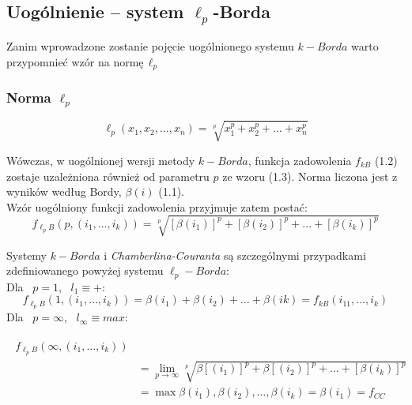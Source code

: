 \documentclass[pdflatex,11pt]{../aghdoc_version2}
\begin{document}
\subsection{Uogólnienie – system $\ell_p$-Borda}
\label{subsec:system_ell_p_borda}

Zanim wprowadzone zostanie pojęcie uogólnionego systemu $k-Borda$ warto przypomnieć wzór na normę\,$\ell_p$
\subsubsection{Norma $\ell_p$}
\label{subsubsection:norma_ell_p}
\begin{equation}
\ell_p(x_1,x_2,\dots, x_n) = \sqrt[p]{x_1^p+x_2^p+\dots+x_n^p}
\end{equation}


Wówczas, w uogólnionej wersji metody $k-Borda$, funkcja zadowolenia $f_{kB}$ (1.2) zostaje uzależniona również od parametru $p$ ze wzoru (1.3). Norma liczona jest z wyników według Bordy, $\beta(i)$ (1.1).\\Wzór uogólniony funkcji zadowolenia przyjmuje zatem postać:
\begin{equation}
f_{\ell_pB}(p,(i_1,\dots,i_k))=\sqrt[p]{[\beta(i_1)]^p+[\beta(i_2)]^p+...+[\beta(i_k)]^p}
\end{equation}

Systemy $k-Borda$ i \textit{Chamberlina-Couranta} są szczególnymi przypadkami zdefiniowanego powyżej systemu $\ell_p-Borda$:\\
Dla \, $p = 1$, \, $l_1 \equiv +$:
\begin{equation}
f_{\ell_pB}(1,(i_1, \dots ,i_k)) = \beta(i_1) + \beta(i_2) + \dots + \beta(ik) = f_{kB}(i_11, \dots,i_k)
\end{equation}
Dla \, $p= \infty$, \, $l_{\infty} \equiv {max}$:

\begin{multline}
\begin{split}
f_{\ell_pB}(\infty,(i_1, \dots ,i_k))\\
&=\lim\limits_{p \to \infty} \sqrt[p]{\beta\left[(i_1)\right]^p+\beta\left[(i_2)\right]^p+ \dots +\left[\beta(i_k)\right]^p}\\
&=\max{\beta(i_1),\beta(i_2),\dots,\beta(i_k)} = \beta(i_1)=f_{CC}
\end{split}
\end{multline}
\end{document}
